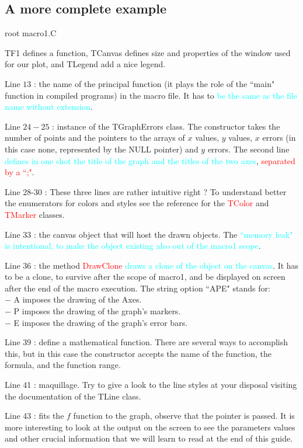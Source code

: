\documentclass[12pt,a4paper]{article}
\begin{document}
\subsection{A more complete example}

root macro1.C

TF1 defines a function, TCanvas defines size and properties of the window used for our plot, and TLegend add a nice legend. 

Line $13$ : the name of the principal function (it plays the role of the ``main" function in compiled programs) in the macro file. It has to \textcolor{cyan}{be the same as the file name without extension}.

Line $24-25$ : instance of the TGraphErrors class. The constructor takes the number of points and the pointers to the arrays of $x$ values, $y$ values, $x$ errors (in this case none, represented by the NULL pointer) and $y$ errors. The second line \textcolor{cyan}{defines in one shot the title of the graph and the titles of the two axes}, \textcolor{red}{separated by a ``;"}.

Line 28-30 : These three lines are rather intuitive right ? To understand better the enumerators for colors and styles see the reference for the \textcolor{red}{TColor} and \textcolor{red}{TMarker} classes.

Line 33 : the canvas object that will host the drawn objects. The \textcolor{cyan}{``memory leak" is intentional, to make the object existing also out of the macro1 scope}.

Line 36 : the method \textcolor{red}{DrawClone} \textcolor{cyan}{draws a clone of the object on the canvas}. It has to be a clone, to survive after the scope of macro1, and be displayed on screen after the end of the macro execution. The string option ``APE" stands for: \\
$-$ A imposes the drawing of the Axes. \\
$-$ P imposes the drawing of the graph’s markers. \\
$-$ E imposes the drawing of the graph’s error bars.
 
Line 39 : define a mathematical function. There are several ways to accomplish this, but in this case the constructor accepts the name of the function, the formula, and the function range.

Line 41 : maquillage. Try to give a look to the line styles at your disposal visiting the documentation of the TLine class.

Line 43 : fits the $f$ function to the graph, observe that the pointer is passed. It is more interesting to look at the output on the screen to see the parameters values and other crucial information that we will learn to read at the end of this guide.
\end{document}
